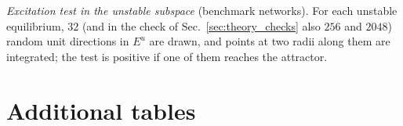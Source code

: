 \emph{Excitation test in the unstable subspace} (benchmark networks). For each unstable equilibrium, $32$ (and in the
check of Sec.~\ref{sec:theory_checks} also $256$ and $2048$) random unit directions in $E^u$ are drawn, and points at two
radii along them are integrated; the test is positive if one of them reaches the attractor.

\section{Additional tables}
\label{app:tables}




